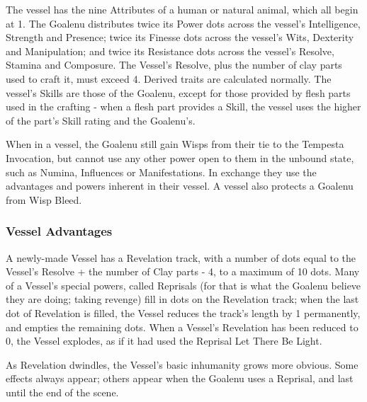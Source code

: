 The vessel has the nine Attributes of a human or natural animal, which all begin at 1. The Goalenu distributes twice its Power dots across the vessel's Intelligence, Strength and Presence; twice its Finesse dots across the vessel's Wits, Dexterity and Manipulation; and twice its Resistance dots across the vessel's Resolve, Stamina and Composure. The Vessel's Resolve, plus the number of clay parts used to craft it, must exceed 4. Derived traits are calculated normally. The vessel's Skills are those of the Goalenu, except for those provided by flesh parts used in the crafting - when a flesh part provides a Skill, the vessel uses the higher of the part's Skill rating and the Goalenu's.

When in a vessel, the Goalenu still gain Wisps from their tie to the Tempesta Invocation, but cannot use any other power open to them in the unbound state, such as Numina, Influences or Manifestations. In exchange they use the advantages and powers inherent in their vessel. A vessel also protects a Goalenu from Wisp Bleed. 

\subsubsection*{Vessel Advantages}

A newly-made Vessel has a Revelation track, with a number of dots equal to the Vessel's Resolve + the number of Clay parts - 4, to a maximum of 10 dots. Many of a Vessel's special powers, called Reprisals (for that is what the Goalenu believe they are doing; taking revenge) fill in dots on the Revelation track; when the last dot of Revelation is filled, the Vessel reduces the track's length by 1 permanently, and empties the remaining dots.  When a Vessel's Revelation has been reduced to 0, the Vessel explodes, as if it had used the Reprisal Let There Be Light.

As Revelation dwindles, the Vessel's basic inhumanity grows more obvious. Some effects always appear; others appear when the Goalenu uses a Reprisal, and last until the end of the scene. 

